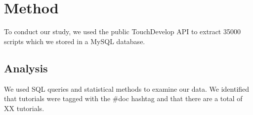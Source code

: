 \section{Method}

To conduct our study, we used the public TouchDevelop API to extract 35000 scripts which we stored in a MySQL database.

\subsection{Analysis}

We used SQL queries and statistical methods to examine our data. We identified that tutorials were tagged with the \#doc hashtag and that there are a total of XX tutorials.